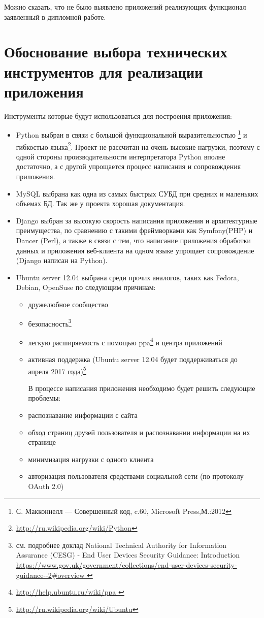 Можно сказать, что не было выявлено приложений реализующих функционал заявленный в дипломной работе. 

\section{Обоснование выбора технических инструментов для реализации приложения}
Инструменты которые будут использоваться для построения приложения:
\begin{itemize}
\item Python выбран в связи с большой функциональной выразительностью
\footnote{С. Макконнелл — Совершенный код, c.60, Microsoft Press,М.:2012} 
и гибкостью языка\footnote{\url{http://ru.wikipedia.org/wiki/Python}}. Проект не рассчитан на очень высокие нагрузки, поэтому с одной стороны производительности интерпретатора Python вполне достаточно, а с другой упрощается процесс написания и сопровождения приложения. \\
\item MySQL выбрана как одна из самых быстрых СУБД при средних и маленьких объемах БД. Так же у проекта хорошая документация.\\
\item Django выбран за высокую скорость написания приложения и архитектурные преимущества, по сравнению с такими фреймворками как Symfony(PHP) и Dancer (Perl), а также в связи с тем, что написание приложения обработки данных и приложения веб-клиента на одном языке упрощает сопровождение (Django написан на Python).\\
\item Ubuntu server 12.04 выбрана среди прочих аналогов, таких как Fedora, Debian, OpenSuse по следующим причинам:\\
	\begin{itemize}
	\item дружелюбное сообщество
	\item безопасность\footnote{см. подробнее доклад National Technical Authority for Information Assurance (CESG) - End User Devices Security Guidance: Introduction   \url{https://www.gov.uk/government/collections/end-user-devices-security-guidance--2\#overview }}
	\item легкую расширяемость с помощью ppa\footnote{\url{http://help.ubuntu.ru/wiki/ppa }}
	 и центра приложений
	\item активная поддержка (Ubuntu server 12.04 будет поддерживаться до апреля 2017 года)\footnote{\url{http://ru.wikipedia.org/wiki/Ubuntu}}
	
	В процессе написания приложения необходимо будет решить следующие проблемы:
	\item распознавание информации с сайта
	\item обход страниц друзей пользователя и распознавании информации на их странице
	\item минимизация нагрузки с одного клиента
	\item авторизация пользователя средствами социальной сети (по протоколу OAuth 2.0)
	
	\end{itemize}
\end{itemize}
